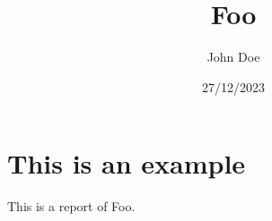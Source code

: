 \documentclass{bookreport}
\title{Foo}
\author{John Doe}
\date{27/12/2023}
\begin{document}
\noteheader{\breadcrumbs}
\maketitle

\section{This is an example}

This is a report of Foo\autocite{foo2023}.

\printbibliography
\end{document}
